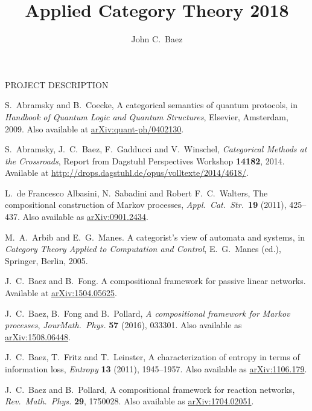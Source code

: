\documentclass[12pt]{amsart}
\newcommand{\ctr}[1]{\begin{center} #1 \end{center}}
\begin{document}
\ctr{\large PROJECT DESCRIPTION}
\title{Applied Category Theory 2018}
\author{John C.\ Baez}

\maketitle

\begin{thebibliography}{10}

 S.\ Abramsky and B.\ Coecke, A categorical semantics of quantum protocols, in \textsl{Handbook of Quantum Logic and Quantum Structures}, Elsevier, Amsterdam, 2009.  Also available at \href{https://arxiv.org/abs/quant-ph/0402130}{arXiv:quant-ph/0402130}.

 S.\ Abramsky, J.\ C.\ Baez, F.\ Gadducci and V.\ Winschel, \textsl{Categorical Methods at the Crossroads}, Report from Dagstuhl Perspectives Workshop \textbf{14182}, 2014.  Available at \href{http://drops.dagstuhl.de/opus/volltexte/2014/4618/}{http://drops.dagstuhl.de/opus/volltexte/2014/4618/}.

 L.\ de Francesco Albasini, N.\ Sabadini and Robert F.\ C.\ Walters, The compositional construction of Markov processes, \textsl{Appl.\ Cat.\ Str.\ }{\bf 19} (2011), 425--437.
Also available as \href{http://arxiv.org/abs/0901.2434}{arXiv:0901.2434}.

 M.\ A.\ Arbib and E.\ G.\ Manes. A categorist’s view of automata and systems, in \textsl{Category Theory Applied to Computation and Control}, E.\ G.\ Manes (ed.), Springer, Berlin, 2005.

  J.\ C.\ Baez and B.\ Fong. A compositional framework for passive linear networks.  Available at \href{https://arxiv.org/abs/1504.05625}{arXiv:1504.05625}.

  J.\ C.\ Baez, B.\ Fong and B.\ Pollard, \textsl{A compositional framework for Markov processes}, \textsl{Jour\. Math.\ Phys.} \textbf{57} (2016), 033301. Also available as \href{https://arxiv.org/abs/1508.06448}{arXiv:1508.06448}.

  J.\ C.\ Baez, T.\ Fritz and T.\ Leinster, A characterization of entropy in terms of information loss, \textsl{Entropy} \textbf{13} (2011), 1945--1957.  Also available as \href{https://arxiv.org/abs/1106.1791}{arXiv:1106.179}.

 J.\ C.\ Baez and B.\ Pollard, A compositional framework for reaction networks, 
\textsl{Rev.\ Math.\ Phys.} \textbf{29}, 1750028.  Also available as \href{https://arxiv.org/abs/1704.02051}{arXiv:1704.02051}.


\end{thebibliography}
\end{document}
